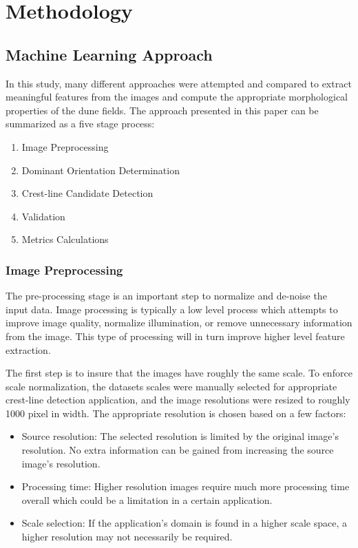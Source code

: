 \section{Methodology}

\subsection{Machine Learning Approach}

In this study, many different approaches were attempted and compared to extract meaningful features from the images and compute the appropriate morphological properties of the dune fields. The approach presented in this paper can be summarized as a five stage process:

\begin{enumerate}
	\item Image Preprocessing
	\item Dominant Orientation Determination
	\item Crest-line Candidate Detection
	\item Validation
	\item Metrics Calculations
\end{enumerate}

\subsubsection{Image Preprocessing}

The pre-processing stage is an important step to normalize and de-noise the input data. Image processing is typically a low level process which attempts to improve image quality, normalize illumination, or remove unnecessary information from the image. This type of processing will in turn improve higher level feature extraction.

The first step is to insure that the images have roughly the same scale. To enforce scale normalization, the datasets scales were manually selected for appropriate crest-line detection application, and the image resolutions were resized to roughly 1000 pixel in width. The appropriate resolution is chosen based on a few factors:

\begin{itemize}
	\item Source resolution: The selected resolution is limited by the original image's resolution. No extra information can be gained from increasing the source image's resolution.
	\item Processing time: Higher resolution images require much more processing time overall which could be a limitation in a certain application.
	\item Scale selection: If the application's domain is found in a higher scale space, a higher resolution may not necessarily be required.
\end{itemize}

